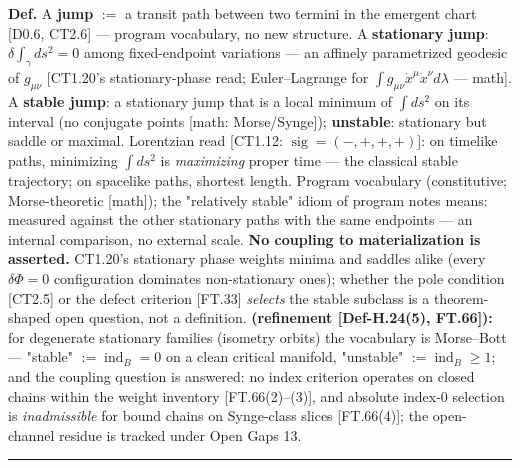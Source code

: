 \begin{definition}\label{tag:Def-H-19}
\textbf{Def.} A \textbf{jump} $:=$ a transit path between two termini in the emergent chart [D0.6, CT2.6] — program vocabulary, no new structure. A \textbf{stationary jump}: $\delta\!\int_\gamma ds^2=0$ among fixed-endpoint variations — an affinely parametrized geodesic of $g_{\mu\nu}$ [CT1.20's stationary-phase read; Euler–Lagrange for $\int g_{\mu\nu}\dot x^\mu\dot x^\nu d\lambda$ — math]. A \textbf{stable jump}: a stationary jump that is a local minimum of $\int ds^2$ on its interval (no conjugate points [math: Morse/Synge]); \textbf{unstable}: stationary but saddle or maximal. Lorentzian read [CT1.12: $\operatorname{sig}=(-,+,+,+)$]: on timelike paths, minimizing $\int ds^2$ is \textit{maximizing} proper time — the classical stable trajectory; on spacelike paths, shortest length. Program vocabulary (constitutive; Morse-theoretic [math]); the "relatively stable" idiom of program notes means: measured against the other stationary paths with the same endpoints — an internal comparison, no external scale. \textbf{No coupling to materialization is asserted.} CT1.20's stationary phase weights minima and saddles alike (every $\delta\Phi=0$ configuration dominates non-stationary ones); whether the pole condition [CT2.5] or the defect criterion [FT.33] \textit{selects} the stable subclass is a theorem-shaped open question, not a definition. \textbf{(refinement [Def-H.24(5), FT.66]):} for degenerate stationary families (isometry orbits) the vocabulary is Morse–Bott — "stable" $:=\operatorname{ind}_B=0$ on a clean critical manifold, "unstable" $:=\operatorname{ind}_B\ge1$; and the coupling question is answered: no index criterion operates on closed chains within the weight inventory [FT.66(2)–(3)], and absolute index-0 selection is \textit{inadmissible} for bound chains on Synge-class slices [FT.66(4)]; the open-channel residue is tracked under Open Gaps 13.

\vspace{2pt}\noindent\rule{\textwidth}{0.4pt}\vspace{2pt}

\end{definition}

